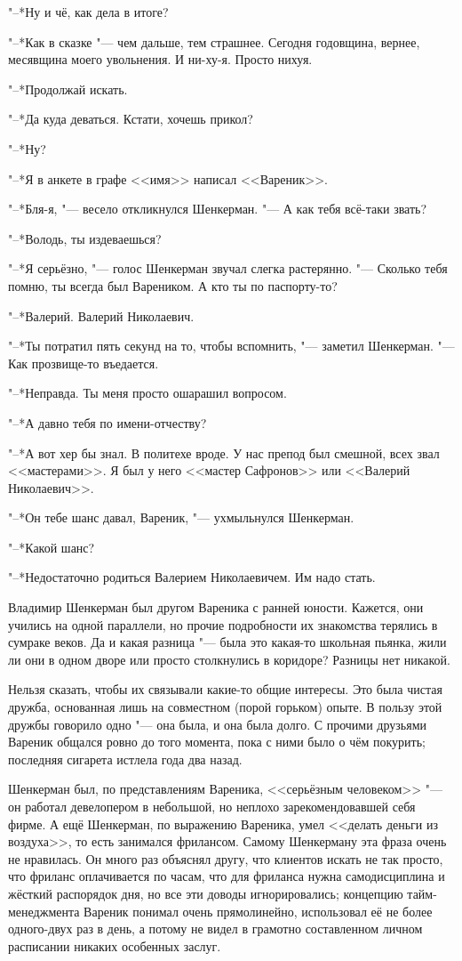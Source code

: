 \textspace

"--*Ну и чё, как дела в итоге?

"--*Как в сказке "--- чем дальше, тем страшнее.
Сегодня годовщина, вернее, месявщина моего увольнения.
И ни-ху-я.
Просто нихуя.

"--*Продолжай искать.

"--*Да куда деваться.
Кстати, хочешь прикол?

"--*Ну?

"--*Я в анкете в графе <<имя>> написал <<Вареник>>.

"--*Бля-я, "--- весело откликнулся Шенкерман.
"--- А как тебя всё-таки звать?

"--*Володь, ты издеваешься?

"--*Я серьёзно, "--- голос Шенкерман звучал слегка растерянно.
"--- Сколько тебя помню, ты всегда был Вареником.
А кто ты по паспорту-то?

"--*Валерий.
Валерий Николаевич.

"--*Ты потратил пять секунд на то, чтобы вспомнить, "--- заметил Шенкерман.
"--- Как прозвище-то въедается.

"--*Неправда.
Ты меня просто ошарашил вопросом.

"--*А давно тебя по имени-отчеству?

"--*А вот хер бы знал.
В политехе вроде.
У нас препод был смешной, всех звал <<мастерами>>.
Я был у него <<мастер Сафронов>> или <<Валерий Николаевич>>.

"--*Он тебе шанс давал, Вареник, "--- ухмыльнулся Шенкерман.

"--*Какой шанс?

"--*Недостаточно родиться Валерием Николаевичем.
Им надо стать.

Владимир Шенкерман был другом Вареника с ранней юности.
Кажется, они учились на одной параллели, но прочие подробности их знакомства терялись в сумраке веков.
Да и какая разница "--- была это какая-то школьная пьянка, жили ли они в одном дворе или просто столкнулись в коридоре?
Разницы нет никакой.

Нельзя сказать, чтобы их связывали какие-то общие интересы.
Это была чистая дружба, основанная лишь на совместном (порой горьком) опыте.
В пользу этой дружбы говорило одно "--- она была, и она была долго.
С прочими друзьями Вареник общался ровно до того момента, пока с ними было о чём покурить;
последняя сигарета истлела года два назад.

Шенкерман был, по представлениям Вареника, <<серьёзным человеком>> "--- он работал девелопером в небольшой, но неплохо зарекомендовавшей себя фирме.
А ещё Шенкерман, по выражению Вареника, умел <<делать деньги из воздуха>>, то есть занимался фрилансом.
Самому Шенкерману эта фраза очень не нравилась.
Он много раз объяснял другу, что клиентов искать не так просто, что фриланс оплачивается по часам, что для фриланса нужна самодисциплина и жёсткий распорядок дня, но все эти доводы игнорировались;
концепцию тайм-менеджмента Вареник понимал очень прямолинейно, использовал её не более одного-двух раз в день, а потому не видел в грамотно составленном личном расписании никаких особенных заслуг.


